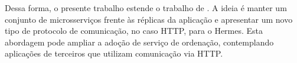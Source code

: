 Dessa forma, o presente trabalho estende o trabalho de \textcite{renan2021hermes}. A ideia é manter um conjunto de microsserviços frente às réplicas da aplicação
e apresentar um novo tipo de protocolo de comunicação, no caso HTTP, para o Hermes. 
Esta abordagem pode ampliar a adoção de serviço de ordenação, contemplando
aplicações de terceiros que utilizam comunicação via HTTP.






